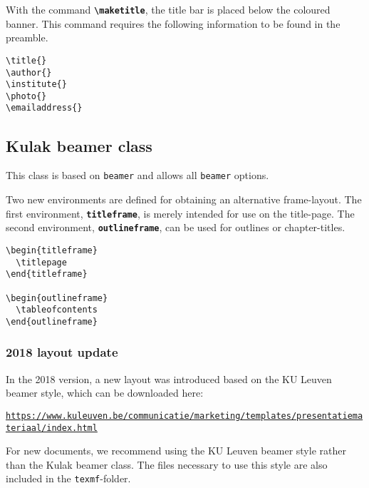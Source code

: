\documentclass[a4paper,kulak]{kulakarticle} %
\begin{document}
With the command \textbf{\texttt{\textbackslash maketitle}}, the title bar is placed below the coloured banner. This command requires the following information to be found in the preamble.

\begin{description}
\item[\texttt{\textbackslash title\{\}}]
\item[\texttt{\textbackslash author\{\}}]
\item[\texttt{\textbackslash institute\{\}}]
\item[\texttt{\textbackslash photo\{\}}]
\item[\texttt{\textbackslash emailaddress\{\}}]
\end{description}

\subsection{Kulak beamer class}

This class is based on \texttt{beamer} and allows all \texttt{beamer} options. 

Two new environments are defined for obtaining an alternative frame-layout. The first environment, \textbf{\texttt{titleframe}}, is merely intended for use on the title-page. The second environment, \textbf{\texttt{outlineframe}}, can be used for outlines or chapter-titles.

\begin{verbatim}
\begin{titleframe}
  \titlepage
\end{titleframe}

\begin{outlineframe}
  \tableofcontents
\end{outlineframe}
\end{verbatim}

\subsubsection{2018 layout update}
\label{sssec:style}

In the 2018 version, a new layout was introduced based on the KU Leuven beamer style, which can be downloaded here:

\href{https://www.kuleuven.be/communicatie/marketing/templates/presentatiemateriaal/index.html}{\texttt{https://www.kuleuven.be/communicatie/marketing/templates/presentatiemateriaal/index.html}}

For new documents, we recommend using the KU Leuven beamer style rather than the Kulak beamer class. The files necessary to use this style are also included in the \texttt{texmf}-folder.
\end{document}
